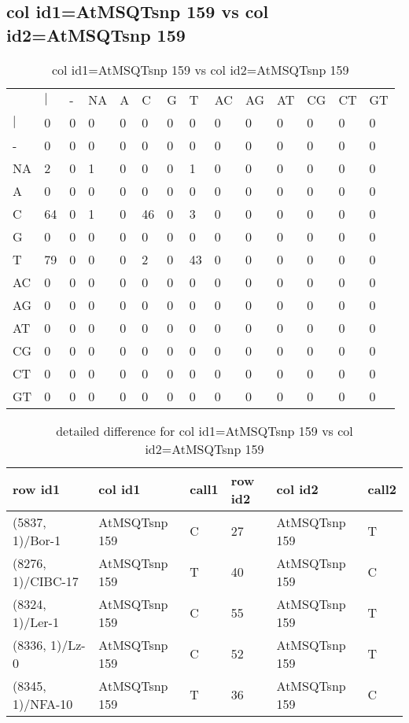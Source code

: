 \subsection{col id1=AtMSQTsnp 159 vs col id2=AtMSQTsnp 159}
\begin{center}
\begin{longtable}{|l|l|l|l|l|l|l|l|l|l|l|l|l|l|}
\caption{col id1=AtMSQTsnp 159 vs col id2=AtMSQTsnp 159} \label{table_dm536}\\
\hline
\\
\hline
&$|$&-&NA&A&C&G&T&AC&AG&AT&CG&CT&GT\\
$|$&0&0&0&0&0&0&0&0&0&0&0&0&0\\
-&0&0&0&0&0&0&0&0&0&0&0&0&0\\
NA&2&0&1&0&0&0&1&0&0&0&0&0&0\\
A&0&0&0&0&0&0&0&0&0&0&0&0&0\\
C&64&0&1&0&46&0&3&0&0&0&0&0&0\\
G&0&0&0&0&0&0&0&0&0&0&0&0&0\\
T&79&0&0&0&2&0&43&0&0&0&0&0&0\\
AC&0&0&0&0&0&0&0&0&0&0&0&0&0\\
AG&0&0&0&0&0&0&0&0&0&0&0&0&0\\
AT&0&0&0&0&0&0&0&0&0&0&0&0&0\\
CG&0&0&0&0&0&0&0&0&0&0&0&0&0\\
CT&0&0&0&0&0&0&0&0&0&0&0&0&0\\
GT&0&0&0&0&0&0&0&0&0&0&0&0&0\\
\hline
\end{longtable}
\end{center}

\begin{center}
\begin{longtable}{|l|l|l|l|l|l|}
\caption{detailed difference for col id1=AtMSQTsnp 159 vs col id2=AtMSQTsnp 159} \label{table_dm537}\\
\hline
row id1&col id1&call1&row id2&col id2&call2\\
\hline
(5837, 1)/Bor-1&AtMSQTsnp 159&C&27&AtMSQTsnp 159&T\\
(8276, 1)/CIBC-17&AtMSQTsnp 159&T&40&AtMSQTsnp 159&C\\
(8324, 1)/Ler-1&AtMSQTsnp 159&C&55&AtMSQTsnp 159&T\\
(8336, 1)/Lz-0&AtMSQTsnp 159&C&52&AtMSQTsnp 159&T\\
(8345, 1)/NFA-10&AtMSQTsnp 159&T&36&AtMSQTsnp 159&C\\
\hline
\end{longtable}
\end{center}

